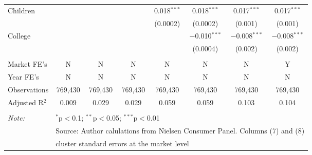 \begin{table}[!htbp]
\begin{tabular}{@{\extracolsep{5pt}}lccccccc}
  Children &  &  &  & 0.018$^{***}$ & 0.018$^{***}$ & 0.017$^{***}$ & 0.017$^{***}$ \\ 
  &  &  &  & (0.0002) & (0.0002) & (0.001) & (0.001) \\ 
  College &  &  &  &  & $-$0.010$^{***}$ & $-$0.008$^{***}$ & $-$0.008$^{***}$ \\ 
  &  &  &  &  & (0.0004) & (0.002) & (0.002) \\ 
 \hline \\[-1.8ex] 
Market FE's & N & N & N & N & N & N & Y \\ 
Year FE's & N & N & N & N & N & N & N \\ 
Observations & 769,430 & 769,430 & 769,430 & 769,430 & 769,430 & 769,430 & 769,430 \\ 
Adjusted R$^{2}$ & 0.009 & 0.029 & 0.029 & 0.059 & 0.059 & 0.103 & 0.104 \\ 
\hline 
\hline \\[-1.8ex] 
\textit{Note:}  & \multicolumn{7}{l}{$^{*}$p$<$0.1; $^{**}$p$<$0.05; $^{***}$p$<$0.01} \\ 
 & \multicolumn{7}{l}{Source: Author calulations from Nielsen Consumer Panel. Columns (7) and (8) } \\ 
 & \multicolumn{7}{l}{cluster standard errors at the market level} \\ 
\end{tabular} 
\end{table} 
